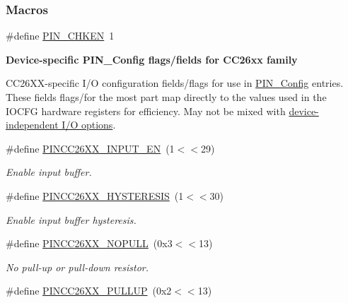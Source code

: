 \subsubsection*{Macros}
\begin{DoxyCompactItemize}
\item 
\#define \hyperlink{_p_i_n_c_c26_x_x_8h_a62bc64a4f307af84ae177c2675de76a1}{P\+I\+N\+\_\+\+C\+H\+K\+E\+N}~1
\end{DoxyCompactItemize}
\begin{Indent}{\bf Device-\/specific P\+I\+N\+\_\+\+Config flags/fields for C\+C26xx family}\par
{\em \label{_p_i_n_c_c26_x_x_8h_PINCC26XX_FLAGS}%
\hypertarget{_p_i_n_c_c26_x_x_8h_PINCC26XX_FLAGS}{}%


C\+C26\+X\+X-\/specific I/\+O configuration fields/flags for use in \hyperlink{_p_i_n_8h_ae427b7d2925f9b0f3145e455cfdb5841}{P\+I\+N\+\_\+\+Config} entries. These fields flags/for the most part map directly to the values used in the {\ttfamily I\+O\+C\+F\+G} hardware registers for efficiency. May not be mixed with \hyperlink{_p_i_n_8h_PIN_GENERIC_FLAGS}{device-\/independent I/\+O options}. }\begin{DoxyCompactItemize}
\item 
\#define \hyperlink{_p_i_n_c_c26_x_x_8h_adceda75e6ee6dfdae2fd7769b809fc0e}{P\+I\+N\+C\+C26\+X\+X\+\_\+\+I\+N\+P\+U\+T\+\_\+\+E\+N}~(1$<$$<$29)
\begin{DoxyCompactList}\small\item\em Enable input buffer. \end{DoxyCompactList}\item 
\#define \hyperlink{_p_i_n_c_c26_x_x_8h_a63fe5dc3570f58ba8aa123db1cee6fe7}{P\+I\+N\+C\+C26\+X\+X\+\_\+\+H\+Y\+S\+T\+E\+R\+E\+S\+I\+S}~(1$<$$<$30)
\begin{DoxyCompactList}\small\item\em Enable input buffer hysteresis. \end{DoxyCompactList}\item 
\#define \hyperlink{_p_i_n_c_c26_x_x_8h_a8e3b3ef05fc9e291a6d9ad9971b8142c}{P\+I\+N\+C\+C26\+X\+X\+\_\+\+N\+O\+P\+U\+L\+L}~(0x3$<$$<$13)
\begin{DoxyCompactList}\small\item\em No pull-\/up or pull-\/down resistor. \end{DoxyCompactList}\item 
\#define \hyperlink{_p_i_n_c_c26_x_x_8h_a25291b96b05bfa0e4ff6365da4cbf221}{P\+I\+N\+C\+C26\+X\+X\+\_\+\+P\+U\+L\+L\+U\+P}~(0x2$<$$<$13)

\end{DoxyCompactItemize}
\end{Indent}
